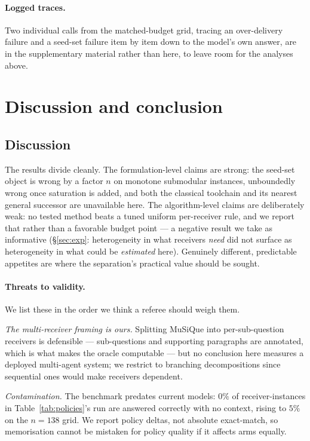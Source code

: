 \documentclass[sigconf,anonymous]{aamas}
\theoremstyle{remark}
\begin{document}
\paragraph{Logged traces.} Two individual calls from the matched-budget
grid, tracing an over-delivery failure and a seed-set failure item by
item down to the model's own answer, are in the supplementary material
rather than here, to leave room for the analyses above.

\section{Discussion and conclusion}
\subsection{Discussion}
\label{sec:disc}

The results divide cleanly. The formulation-level claims are strong:
the seed-set object is wrong by a factor $n$ on monotone submodular
instances, unboundedly wrong once saturation is added, and both the
classical toolchain and its nearest general successor are unavailable
here. The algorithm-level claims are deliberately weak: no tested
method beats a tuned uniform per-receiver rule, and we report that
rather than a favorable budget point --- a negative result we take as
informative (\S\ref{sec:exp}: heterogeneity in what receivers
\emph{need} did not surface as heterogeneity in what could be
\emph{estimated} here). Genuinely different, predictable appetites are
where the separation's practical value should be sought.

\paragraph{Threats to validity.} We list these in the order we think a
referee should weigh them.

\emph{The multi-receiver framing is ours.} Splitting MuSiQue into
per-sub-question receivers is defensible --- sub-questions and
supporting paragraphs are annotated, which is what makes the oracle
computable --- but no conclusion here measures a deployed multi-agent
system; we restrict to branching decompositions since sequential ones
would make receivers dependent.

\emph{Contamination.} The benchmark predates current models: $0\%$ of
receiver-instances in Table~\ref{tab:policies}'s run are answered
correctly with no context, rising to $5\%$ on the $n{=}138$ grid. We
report policy deltas, not absolute exact-match, so memorisation cannot
be mistaken for policy quality if it affects arms equally.
\end{document}

